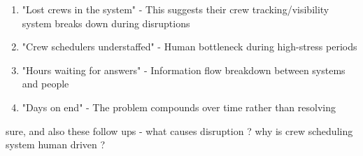 \begin{botresponse}
\begin{enumerate}
\item "Lost crews in the system" - This suggests their crew tracking/visibility system breaks down during disruptions
\item "Crew schedulers understaffed" - Human bottleneck during high-stress periods
\item "Hours waiting for answers" - Information flow breakdown between systems and people
\item "Days on end" - The problem compounds over time rather than resolving
\end{enumerate}
\end{botresponse}

\begin{userprompt}
sure, and also these follow ups  - what causes disruption ? why is crew scheduling system human driven ?
\end{userprompt}

